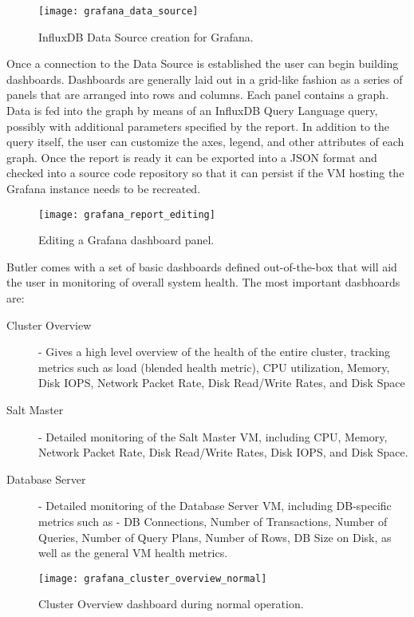 \begin{figure}[h]
\texttt{[image: grafana\_data\_source]}
\centering
\caption {InfluxDB Data Source creation for Grafana.}
\label{fig:grafana_data_source}
\end{figure}

Once a connection to the Data Source is established the user can begin building dashboards. Dashboards are generally laid out in a grid-like fashion as a series of panels that are arranged into rows and columns. Each panel contains a graph. Data is fed into the graph by means of an InfluxDB Query Language query, possibly with additional parameters specified by the report.  In addition to the query itself, the user can customize the axes, legend, and other attributes of each graph. Once the report is ready it can be exported into a JSON format and checked into a source code repository so that it can persist if the VM hosting the Grafana instance needs to be recreated.

\begin{figure}[h]
\texttt{[image: grafana\_report\_editing]}
\centering
\caption {Editing a Grafana dashboard panel.}
\label{fig:grafana_report_editing}
\end{figure}

Butler comes with a set of basic dashboards defined out-of-the-box that will aid the user in monitoring of overall system health. The most important dasbhoards are:

\begin{description}
\item [Cluster Overview] - Gives a high level overview of the health of the entire cluster, tracking metrics such as load (blended health metric), CPU utilization, Memory, Disk IOPS, Network Packet Rate, Disk Read/Write Rates, and Disk Space
\item [Salt Master] - Detailed monitoring of the Salt Master VM, including CPU, Memory, Network Packet Rate, Disk Read/Write Rates, Disk IOPS, and Disk Space.
\item [Database Server] - Detailed monitoring of the Database Server VM, including DB-specific metrics such as - DB Connections, Number of Transactions, Number of Queries, Number of Query Plans, Number of Rows, DB Size on Disk, as well as the general VM health metrics.
\end{description}

\begin{figure}[h]
\texttt{[image: grafana\_cluster\_overview\_normal]}
\centering
\caption {Cluster Overview dashboard during normal operation.}
\label{fig:grafana_cluster_overview_normal}
\end{figure}

